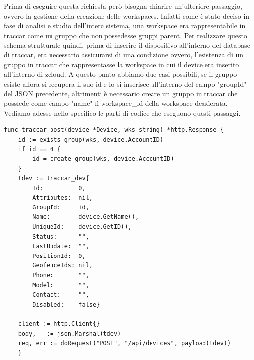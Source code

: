 \documentclass[a4paper,titlepage,12pt]{book}
\begin{document}
\noindent Prima di eseguire questa richiesta però bisogna chiarire un'ulteriore passaggio, ovvero la gestione della creazione delle workspaces. Infatti come è stato deciso in fase di analisi e studio dell'intero sistema, una workspace era rappresentabile in traccar come un gruppo che non possedesse gruppi parent. Per realizzare questo schema strutturale quindi, prima di inserire il dispositivo all'interno del database di traccar, era necessario assicurarsi di una condizione ovvero, l'esistenza di un gruppo in traccar che rappresentasse la workspace in cui il device era inserito all'interno di zcloud. A questo punto abbiamo due casi possibili, se il gruppo esiste allora si recupera il suo id e lo si inserisce all'interno del campo "groupId" del JSON precedente, altrimenti è necessario creare un gruppo in traccar che possiede come campo "name" il workspace\_id della workspace desiderata. Vediamo adesso nello specifico le parti di codice che eseguono questi passaggi.\\

\begin{verbatim}
func traccar_post(device *Device, wks string) *http.Response {
	id := exists_group(wks, device.AccountID)
	if id == 0 {
		id = create_group(wks, device.AccountID)
	}
    tdev := traccar_dev{
		Id:          0,
		Attributes:  nil,
		GroupId:     id,
		Name:        device.GetName(),
		UniqueId:    device.GetID(),
		Status:      "",
		LastUpdate:  "",
		PositionId:  0,
		GeofenceIds: nil,
		Phone:       "",
		Model:       "",
		Contact:     "",
		Disabled:    false}

	client := http.Client{}
	body, _ := json.Marshal(tdev)
	req, err := doRequest("POST", "/api/devices", payload(tdev))
	}
\end{verbatim}
\end{document}
